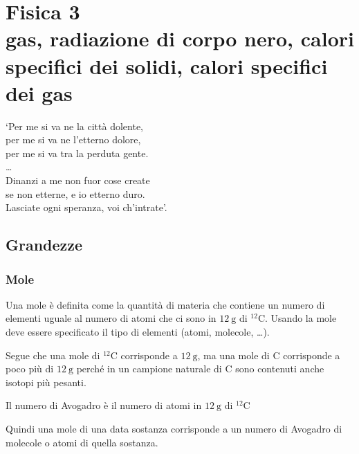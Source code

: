\part[Fisica 3]{Fisica 3\\\vspace{1cm}\large{gas, radiazione di corpo nero, calori specifici dei solidi, calori specifici dei gas}}
\begin{savequote}[6cm]
`Per me si va ne la città dolente,\\ per me si va ne l'etterno dolore,\\ per me si va tra la perduta gente.\\
\ldots\\
Dinanzi a me non fuor cose create\\ se non etterne, e io etterno duro.\\ Lasciate ogni speranza, voi ch'intrate'.
\end{savequote}
\chapter{Grandezze}
\minitoc
\section{Mole}
\begin{Def}[mole]
Una mole è definita come la quantità di materia che contiene un numero di elementi uguale al numero di atomi che ci sono in $\SI{12}{\gram}$ di $^{12}\mathrm{C}$. Usando la mole deve essere specificato il tipo di elementi (atomi, molecole, \ldots).
\end{Def}
Segue che una mole di $^{12}\mathrm{C}$ corrisponde a $\SI{12}{\gram}$, ma una mole di $\mathrm{C}$ corrisponde a poco più di $\SI{12}{\gram}$ perché in un campione naturale di $\mathrm{C}$ sono contenuti anche isotopi più pesanti.
\begin{Def}
Il numero di Avogadro è il numero di atomi in $\SI{12}{\gram}$ di $^{12}\mathrm{C}$
\end{Def}
Quindi una mole di una data sostanza corrisponde a un numero di Avogadro di molecole o atomi di quella sostanza.
